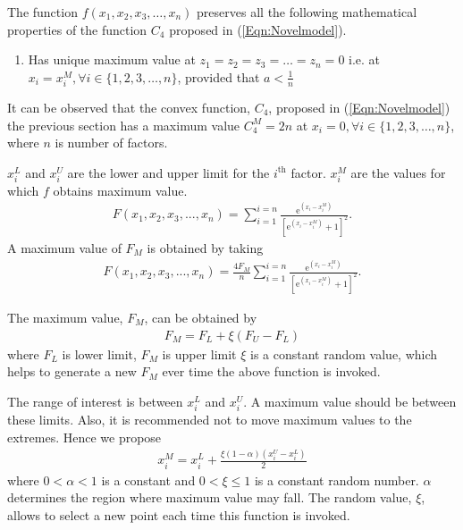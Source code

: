 \documentclass[twocolumn]{svjour3}          %
\newcommand{\me}{\mathrm{e}}
\begin{document}
The function $f(x_1, x_2, x_3, \dots, x_n)$ preserves all the following mathematical properties of the function $C_4$ proposed in (\ref{Eqn:Novelmodel}).
\begin{enumerate}
	\item Has unique maximum value at $z_1 = z_2 = z_3 = \dots = z_n = 0$ i.e. at $x_i=x_i^M, \forall i\in\{1, 2, 3, \dots, n\}$, provided that $a<\frac{1}{n}$
\end{enumerate}
\par
It can be observed that the convex function, $C_4$, proposed in (\ref{Eqn:Novelmodel}) the previous section has a maximum value $C_4^{M}=2n$ at $x_i=0, \forall i\in\{1, 2, 3, \dots, n\}$, where $n$ is number of factors. 
\par

\par
$x_i^L$ and $x_i^U$ are the lower and upper limit for the $i^{\text{th}}$ factor. $x_i^M$ are the values for which $f$ obtains maximum value.
\begin{eqnarray}
	F(x_1, x_2, x_3, ..., x_n) = \sum_{i=1}^{i=n}{\frac{\me^{(x_i-x_i^M)}}{[\me^{(x_i-x_i^M)}+1]^2}}. \label{Eqn:DiffSigmoidMultiChangeMaxPoint}
\end{eqnarray}
A maximum value of $F_M$ is obtained by taking
\begin{eqnarray}
	F(x_1, x_2, x_3, ..., x_n) = \frac{4F_M}{n}\sum_{i=1}^{i=n}{\frac{\me^{(x_i-x_i^M)}}{[\me^{(x_i-x_i^M)}+1]^2}}. \label{Eqn:DiffSigmoidMultiChangeMaxValue}
\end{eqnarray}
\par
The maximum value, $F_M$, can be obtained by
\begin{eqnarray}
	F_M = F_L + \xi(F_U-F_L) \label{Eqn:MaxValueSelection}
\end{eqnarray}
where $F_L$ is lower limit, $F_M$ is upper limit $\xi$ is a constant random value, which helps to generate a new $F_M$ ever time the above function is invoked.
\par
The range of interest is between $x_i^L$ and $x_i^U$. A maximum value should be between these limits. Also, it is recommended not to move maximum values to the extremes. Hence we propose
\begin{eqnarray}
	x_i^M = x_i^L + \frac{\xi(1-\alpha)(x_i^U-x_i^L)}{2} \label{Eqn:MaxPointSelection}
\end{eqnarray}
where $0<\alpha <1$ is a constant and $0<\xi\le 1$ is a constant random number. $\alpha$ determines the region where maximum value may fall. The random value, $\xi$, allows to select a new point each time this function is invoked.
\end{document}
